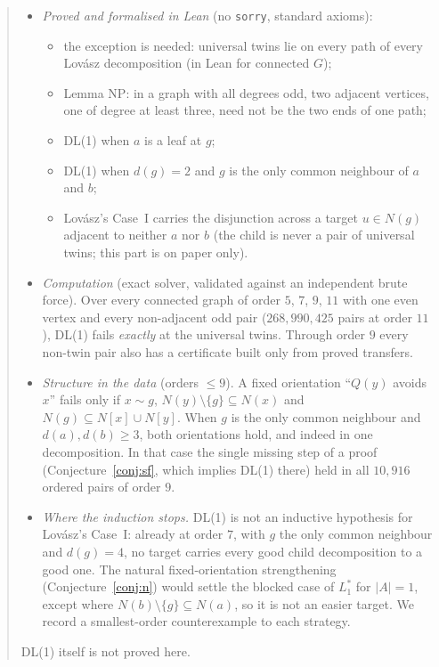 \documentclass[11pt]{amsart}
\theoremstyle{definition}
\begin{document}
\begin{abstract}
\begin{itemize}
\item \emph{Proved and formalised in Lean} (no \texttt{sorry}, standard axioms):
  \begin{itemize}
  \item the exception is needed: universal twins lie on every path of every Lov\'asz decomposition
  (in Lean for connected $G$);
  \item Lemma NP: in a graph with all degrees odd, two adjacent vertices, one of degree at least
  three, need not be the two ends of one path;
  \item DL(1) when $a$ is a leaf at $g$;
  \item DL(1) when $d(g)=2$ and $g$ is the only common neighbour of $a$ and $b$;
  \item Lov\'asz's Case~I carries the disjunction across a target $u\in N(g)$ adjacent to neither
  $a$ nor $b$ (the child is never a pair of universal twins; this part is on paper only).
  \end{itemize}
\item \emph{Computation} (exact solver, validated against an independent brute force).
  Over every connected graph of order $5$, $7$, $9$, $11$ with one even vertex and every
  non-adjacent odd pair ($268{,}990{,}425$ pairs at order $11$), DL(1) fails \emph{exactly} at the
  universal twins. Through order $9$ every non-twin pair also has a certificate built only from
  proved transfers.
\item \emph{Structure in the data} (orders $\le9$). A fixed orientation ``$Q(y)$ avoids $x$'' fails
  only if $x\sim g$, $N(y)\setminus\{g\}\subseteq N(x)$ and $N(g)\subseteq N[x]\cup N[y]$. When $g$
  is the only common neighbour and $d(a),d(b)\ge3$, both orientations hold, and indeed in one
  decomposition. In that case the single missing step of a proof (Conjecture~\ref{conj:sf}, which
  implies DL(1) there) held in all $10{,}916$ ordered pairs of order $9$.
\item \emph{Where the induction stops.} DL(1) is not an inductive hypothesis for Lov\'asz's
  Case~I: already at order $7$, with $g$ the only common neighbour and $d(g)=4$, no target carries
  every good child decomposition to a good one. The natural fixed-orientation strengthening
  (Conjecture~\ref{conj:n}) would settle the blocked case of $L_1^*$ for $|A|=1$, except where
  $N(b)\setminus\{g\}\subseteq N(a)$, so it is not an easier target. We record a smallest-order
  counterexample to each strategy.
\end{itemize}
DL(1) itself is not proved here.
\end{abstract}
\maketitle
\end{document}
